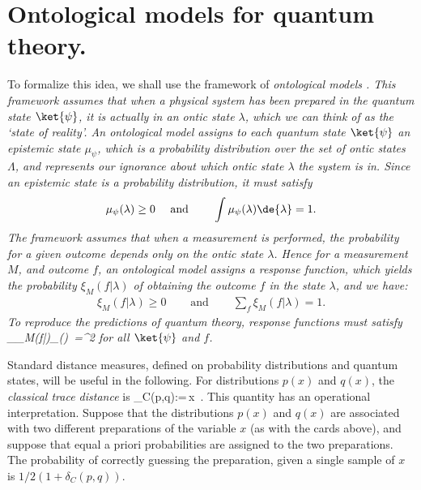 \section*{Ontological models for quantum theory.} To formalize this idea, we shall use the framework  of \em ontological models \em \cite{Spekkens2005, Harrigan2010}. This framework assumes that when a physical system has been prepared in the quantum state $\ket{\psi}$, it is actually in an \em ontic state \em $\lambda$, which we can think of as the `state of reality'. An ontological model assigns to each quantum state $\ket{\psi}$ an \em epistemic state \em  $\mu_\psi$, which is a probability distribution over the set of ontic states $\Lambda$, and represents our ignorance about which ontic state $\lambda$ the system is in. Since an epistemic state is a probability distribution, it must satisfy
\begin{eqnarray} \label{eq:mu}
\mu_\psi(\lambda) \geq 0 & \quad\textrm{   and   }\quad & \int \mu_\psi(\lambda) \de{\lambda} =1.
\end{eqnarray}
The framework assumes that when a measurement is performed, the probability for a given outcome depends only on the ontic state $\lambda$. Hence for a measurement $M$, and outcome $f$, an ontological model assigns a \em response function\em, which yields the probability $\xi_M(f | \lambda)$ of obtaining the outcome $f$ in the state $\lambda$, and we have:
\begin{eqnarray}\label{eq:xi}
\xi_M(f | \lambda) \geq 0 & \quad\textrm{   and   }\quad & \sum_f \xi_M (f | \lambda) =1.
\end{eqnarray}
To reproduce the predictions of quantum theory, response functions must satisfy
\be\label{eq:bornrule}
\int_\Lambda \xi_M(f|\lambda)\mu_\psi(\lambda) \,\lambda=^2
\ee
for all $\ket{\psi}$ and $f$.

Standard distance measures, defined on probability distributions and quantum states, will be useful in the following. For distributions $p(x)$ and $q(x)$, the \emph{classical trace distance} is
\be
\delta_C(p,q):=\int {}\,x \,.
\ee
This quantity has an operational interpretation. Suppose that the distributions $p(x)$ and $q(x)$ are associated with two different preparations of the variable $x$ (as with the cards above), and suppose that equal a priori probabilities are assigned to the two preparations.  The probability of correctly guessing the preparation, given a single sample of $x$ is $1/2(1+\delta_C(p,q))$. 

